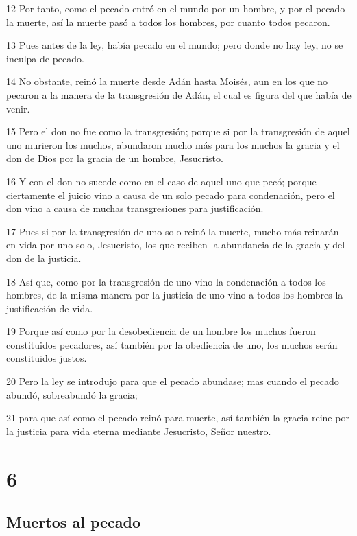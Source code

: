 \par 12 Por tanto, como el pecado entró en el mundo por un hombre, y por el pecado la muerte, así la muerte pasó a todos los hombres, por cuanto todos pecaron.
\par 13 Pues antes de la ley, había pecado en el mundo; pero donde no hay ley, no se inculpa de pecado.
\par 14 No obstante, reinó la muerte desde Adán hasta Moisés, aun en los que no pecaron a la manera de la transgresión de Adán, el cual es figura del que había de venir.
\par 15 Pero el don no fue como la transgresión; porque si por la transgresión de aquel uno murieron los muchos, abundaron mucho más para los muchos la gracia y el don de Dios por la gracia de un hombre, Jesucristo.
\par 16 Y con el don no sucede como en el caso de aquel uno que pecó; porque ciertamente el juicio vino a causa de un solo pecado para condenación, pero el don vino a causa de muchas transgresiones para justificación.
\par 17 Pues si por la transgresión de uno solo reinó la muerte, mucho más reinarán en vida por uno solo, Jesucristo, los que reciben la abundancia de la gracia y del don de la justicia.
\par 18 Así que, como por la transgresión de uno vino la condenación a todos los hombres, de la misma manera por la justicia de uno vino a todos los hombres la justificación de vida.
\par 19 Porque así como por la desobediencia de un hombre los muchos fueron constituidos pecadores, así también por la obediencia de uno, los muchos serán constituidos justos.
\par 20 Pero la ley se introdujo para que el pecado abundase; mas cuando el pecado abundó, sobreabundó la gracia;
\par 21 para que así como el pecado reinó para muerte, así también la gracia reine por la justicia para vida eterna mediante Jesucristo, Señor nuestro.

\chapter{6}

\section*{Muertos al pecado}

